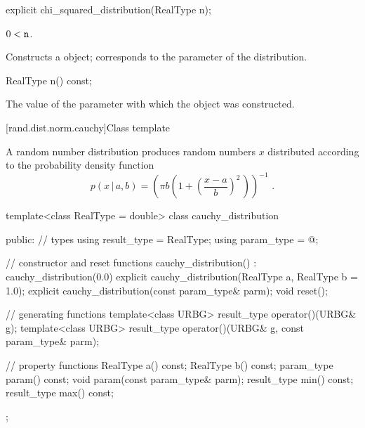 %
\begin{itemdecl}
explicit chi_squared_distribution(RealType n);
\end{itemdecl}

\begin{itemdescr}
\pnum
\requires $0 < \texttt{n}$.

\pnum
\effects Constructs a  object;
 corresponds to the parameter of the distribution.
\end{itemdescr}

%
\begin{itemdecl}
RealType n() const;
\end{itemdecl}

\begin{itemdescr}
\pnum\returns The value of the  parameter
 with which the object was constructed.
\end{itemdescr}


[rand.dist.norm.cauchy]{Class template }%
%
%

\pnum
A  random number distribution
produces random numbers $x$
distributed according to
the probability density function%
%
%
\[  p(x\,|\,a,b) = \left(\pi b \left(1 + \left(\frac{x-a}{b} \right)^2 \, \right)\right)^{-1} \text{ .} \]

%
\begin{codeblock}
template<class RealType = double>
  class cauchy_distribution {
  public:
    // types
    using result_type = RealType;
    using param_type  = @\unspec@;

    // constructor and reset functions
    cauchy_distribution() : cauchy_distribution(0.0) {}
    explicit cauchy_distribution(RealType a, RealType b = 1.0);
    explicit cauchy_distribution(const param_type& parm);
    void reset();

    // generating functions
    template<class URBG>
      result_type operator()(URBG& g);
    template<class URBG>
      result_type operator()(URBG& g, const param_type& parm);

    // property functions
    RealType a() const;
    RealType b() const;
    param_type param() const;
    void param(const param_type& parm);
    result_type min() const;
    result_type max() const;
  };
\end{codeblock}


